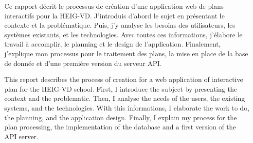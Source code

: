 Ce rapport décrit le processus de création d'une application web de plans interactifs pour la HEIG-VD.
J'introduis d'abord le sujet en présentant le contexte et la problématique.
Puis, j'y analyse les besoins des utilisateurs, les systèmes existants, et les technologies.
Avec toutes ces informations, j'élabore le travail à accomplir, le planning et le design de l'application.
Finalement, j'explique mon processus pour le traitement des plans, la mise en place de la base de donnée
et d'une première version du serveur API.


\asterism

This report describes the process of creation for a web application of interactive plan for the HEIG-VD school.
First, I introduce the subject by presenting the context and the problematic.
Then, I analyse the needs of the users, the existing systems, and the technologies.
With this informations, I elaborate the work to do, the planning, and the application design.
Finally, I explain my process for the plan processing, the implementation of the database and a first version of the API server.